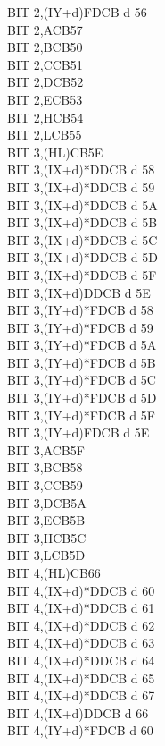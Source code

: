 \documentclass[oneside,a4paper]{book}
\begin{document}
\begin{multicols}{3}
{\begin{tabbing}
BIT 2,(IY+d)\>FDCB d 56\\
BIT 2,A\>CB57\\
BIT 2,B\>CB50\\
BIT 2,C\>CB51\\
BIT 2,D\>CB52\\
BIT 2,E\>CB53\\
BIT 2,H\>CB54\\
BIT 2,L\>CB55\\
BIT 3,(HL)\>CB5E\\
BIT 3,(IX+d)*\>DDCB d 58\\
BIT 3,(IX+d)*\>DDCB d 59\\
BIT 3,(IX+d)*\>DDCB d 5A\\
BIT 3,(IX+d)*\>DDCB d 5B\\
BIT 3,(IX+d)*\>DDCB d 5C\\
BIT 3,(IX+d)*\>DDCB d 5D\\
BIT 3,(IX+d)*\>DDCB d 5F\\
BIT 3,(IX+d)\>DDCB d 5E\\
BIT 3,(IY+d)*\>FDCB d 58\\
BIT 3,(IY+d)*\>FDCB d 59\\
BIT 3,(IY+d)*\>FDCB d 5A\\
BIT 3,(IY+d)*\>FDCB d 5B\\
BIT 3,(IY+d)*\>FDCB d 5C\\
BIT 3,(IY+d)*\>FDCB d 5D\\
BIT 3,(IY+d)*\>FDCB d 5F\\
BIT 3,(IY+d)\>FDCB d 5E\\
BIT 3,A\>CB5F\\
BIT 3,B\>CB58\\
BIT 3,C\>CB59\\
BIT 3,D\>CB5A\\
BIT 3,E\>CB5B\\
BIT 3,H\>CB5C\\
BIT 3,L\>CB5D\\
BIT 4,(HL)\>CB66\\
BIT 4,(IX+d)*\>DDCB d 60\\
BIT 4,(IX+d)*\>DDCB d 61\\
BIT 4,(IX+d)*\>DDCB d 62\\
BIT 4,(IX+d)*\>DDCB d 63\\
BIT 4,(IX+d)*\>DDCB d 64\\
BIT 4,(IX+d)*\>DDCB d 65\\
BIT 4,(IX+d)*\>DDCB d 67\\
BIT 4,(IX+d)\>DDCB d 66\\
BIT 4,(IY+d)*\>FDCB d 60\\

\end{tabbing}}
\end{multicols}
\end{document}
